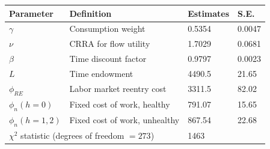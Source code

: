 
    
    \begin{tabular}{p{2.87cm} p{5.57cm} p{2.57cm} p{1.37cm}}%
  \toprule
Parameter & Definition & Estimates & S.E.\\[0.5ex]
 \hline

$\gamma$& Consumption weight	&
0.5354 &0.0047  \\[0.2ex]
$\nu$ & CRRA for flow utility 		&
1.7029 & 0.0681\\[0.2ex]
$\beta$ &Time discount factor		&
0.9797      & 0.0023  \\[0.2ex]
$L$& Time endowment			& 
4490.5  	& 21.65\\[0.2ex]
$\phi_{RE}$& Labor market reentry cost		& 
3311.5 &82.02\\[0.2ex]
$\phi_n(h=0)$& Fixed cost of work, healthy 		& 791.07   	&  15.65 \\[0.2ex]
$\phi_n(h=1,2)$& Fixed cost of work, unhealthy 	& 867.54 		& 22.68	\\[1ex]
\multicolumn{2}{l}{$\chi^2$ statistic (\footnotesize{degrees of freedom} $= 273$)} & 1463\\[0.5ex]
 \bottomrule
    \end{tabular}
